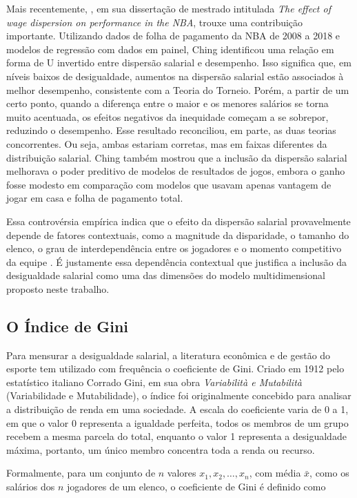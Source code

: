 Mais recentemente, \citet{ching2019}, em sua dissertação de mestrado intitulada \textit{The effect of wage dispersion on performance in the NBA}, trouxe uma contribuição importante. Utilizando dados de folha de pagamento da NBA de 2008 a 2018 e modelos de regressão com dados em painel, Ching identificou uma relação em forma de U invertido entre dispersão salarial e desempenho. Isso significa que, em níveis baixos de desigualdade, aumentos na dispersão salarial estão associados à melhor desempenho, consistente com a Teoria do Torneio. Porém, a partir de um certo ponto, quando a diferença entre o maior e os menores salários se torna muito acentuada, os efeitos negativos da inequidade começam a se sobrepor, reduzindo o desempenho. Esse resultado reconciliou, em parte, as duas teorias concorrentes. Ou seja, ambas estariam corretas, mas em faixas diferentes da distribuição salarial. Ching também mostrou que a inclusão da dispersão salarial melhorava o poder preditivo de modelos de resultados de jogos, embora o ganho fosse modesto em comparação com modelos que usavam apenas vantagem de jogar em casa e folha de pagamento total.

Essa controvérsia empírica indica que o efeito da dispersão salarial provavelmente depende de fatores contextuais, como a magnitude da disparidade, o tamanho do elenco, o grau de interdependência entre os jogadores e o momento competitivo da equipe \citep{beaumont2003}. É justamente essa dependência contextual que justifica a inclusão da desigualdade salarial como uma das dimensões do modelo multidimensional proposto neste trabalho.

\subsection{O Índice de Gini}
\label{sec:gini_index}

Para mensurar a desigualdade salarial, a literatura econômica e de gestão do esporte tem utilizado com frequência o coeficiente de Gini. Criado em 1912 pelo estatístico italiano Corrado Gini, em sua obra \textit{Variabilità e Mutabilità} (Variabilidade e Mutabilidade), o índice foi originalmente concebido para analisar a distribuição de renda em uma sociedade. A escala do coeficiente varia de 0 a 1, em que o valor 0 representa a igualdade perfeita, todos os membros de um grupo recebem a mesma parcela do total, enquanto o valor 1 representa a desigualdade máxima, portanto, um único membro concentra toda a renda ou recurso.

Formalmente, para um conjunto de $n$ valores $x_1, x_2, \ldots, x_n$, com média $\bar{x}$, como os salários dos $n$ jogadores de um elenco, o coeficiente de Gini é definido como

